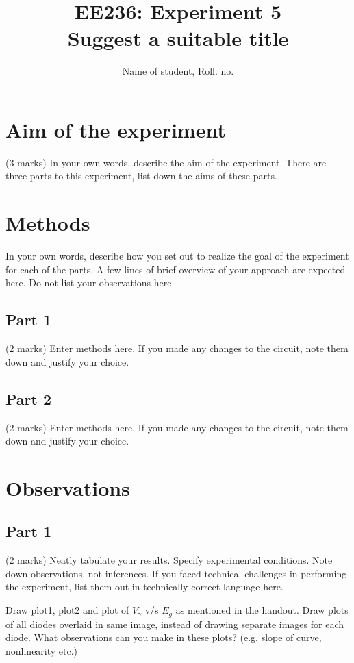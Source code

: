 \documentclass[12pt]{article}
\title{EE236: Experiment 5\\
Suggest a suitable title}
\author{Name of student, Roll. no.}
\begin{document}
\maketitle

\section{Aim of the experiment}

(3 marks) In your own words, describe the aim of the experiment. There are three parts to this experiment, list down the aims of these parts.

\section{Methods}

In your own words, describe how you set out to realize the goal of the experiment for each of the parts. A few lines of brief overview of your approach are expected here. Do not list your observations here.

\subsection{Part 1}

(2 marks) Enter methods here. If you made any changes to the circuit, note them down and justify your choice.

\subsection{Part 2}

(2 marks) Enter methods here. If you made any changes to the circuit, note them down and justify your choice.

\section{Observations}

\subsection{Part 1}

(2 marks) Neatly tabulate your results. Specify experimental conditions. Note down observations, not inferences. If you faced technical challenges in performing the experiment, list them out in technically correct language here.

Draw plot1, plot2 and plot of $V_\gamma$ v/s $E_g$ as mentioned in the handout. Draw plots of all diodes overlaid in same image, instead of drawing separate images for each diode. What observations can you make in these plots? (e.g. slope of curve, nonlinearity etc.)
\end{document}
